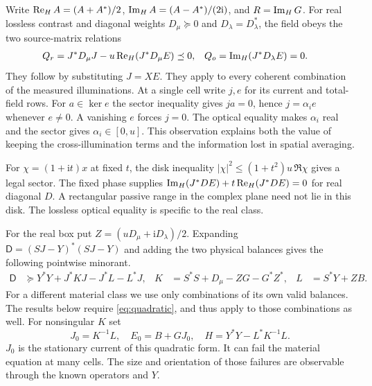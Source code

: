 Write $\operatorname{Re}_{H} A=(A+A^*)/2$, $\operatorname{Im}_{H} A=(A-A^*)/(2\mathrm i)$, and $R=\operatorname{Im}_{H} G$. For real lossless contrast and diagonal weights $D_\mu\succeq0$ and $D_\lambda=D_\lambda^*$, the field obeys the two source-matrix relations
\begin{align}
 Q_r&=J^*D_\mu J-u\operatorname{Re}_{H}(J^*D_\mu E)\preceq0,&
 Q_o&=\operatorname{Im}_{H}(J^*D_\lambda E)=0. \label{eq:balances}
\end{align}
They follow by substituting $J=XE$. They apply to every coherent combination of the measured illuminations. At a single cell write $j,e$ for its current and total-field rows. For $a\in\ker e$ the sector inequality gives $ja=0$, hence $j=\alpha_i e$ whenever $e\ne0$. A vanishing $e$ forces $j=0$. The optical equality makes $\alpha_i$ real and the sector gives $\alpha_i\in[0,u]$. This observation explains both the value of keeping the cross-illumination terms and the information lost in spatial averaging.

For $\chi=(1+\mathrm it)x$ at fixed $t$, the disk inequality $|\chi|^2\le (1+t^2)u\,\Re\chi$ gives a legal sector. The fixed phase supplies $\operatorname{Im}_{H}(J^*D E)+t\operatorname{Re}_{H}(J^*D E)=0$ for real diagonal $D$. A rectangular passive range in the complex plane need not lie in this disk. The lossless optical equality is specific to the real class.

For the real box put $Z=(uD_\mu+\mathrm iD_\lambda)/2$. Expanding $\mathsf D=(SJ-Y)^*(SJ-Y)$ and adding the two physical balances gives the following pointwise minorant.
\begin{align}
 \mathsf D&\succeq Y^*Y+J^*KJ-J^*L-L^*J,&
 K&=S^*S+D_\mu-ZG-G^*Z^*,& L&=S^*Y+ZB. \label{eq:quadratic}
\end{align}
For a different material class we use only combinations of its own valid balances. The results below require \eqref{eq:quadratic}, and thus apply to those combinations as well. For nonsingular $K$ set
\begin{equation}
 J_0=K^{-1}L,\quad E_0=B+GJ_0,\quad H=Y^*Y-L^*K^{-1}L .
 \label{eq:center}
\end{equation}
$J_0$ is the stationary current of this quadratic form. It can fail the material equation at many cells. The size and orientation of those failures are observable through the known operators and $Y$.
